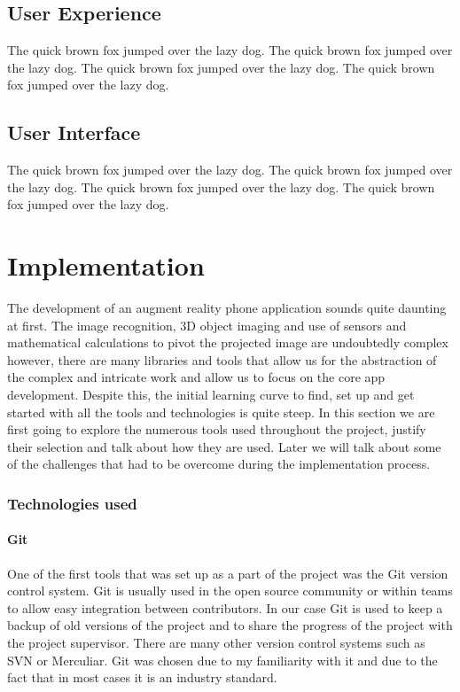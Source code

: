 \documentclass{l4proj}
\begin{document}
\section{User Experience}
The quick brown fox jumped over the lazy dog.
The quick brown fox jumped over the lazy dog.
The quick brown fox jumped over the lazy dog.
The quick brown fox jumped over the lazy dog.
\section{User Interface}
The quick brown fox jumped over the lazy dog.
The quick brown fox jumped over the lazy dog.
The quick brown fox jumped over the lazy dog.
The quick brown fox jumped over the lazy dog.

\chapter{Implementation}
The development of an augment reality phone application sounds quite daunting at first. The image recognition, 3D object imaging and use of sensors and mathematical calculations to pivot the projected image are undoubtedly complex however, there are many libraries and tools that allow us for the abstraction of the complex and intricate work and allow us to focus on the core app development. Despite this, the initial learning curve to find, set up and get started with all the tools and technologies is quite steep. In this section we are first going to explore the numerous tools used throughout the project, justify their selection and talk about how they are used. Later we will talk about some of the challenges that had to be overcome during the implementation process. 
\subsection{Technologies used}
\subsubsection{Git}
One of the first tools that was set up as a part of the project was the Git version control system. Git is usually used in the open source community or within teams to allow easy integration between contributors. In our case Git is used to keep a backup of old versions of the project and to share the progress of the project with the project supervisor. There are many other version control systems such as SVN or Merculiar. Git was chosen due to my familiarity with it and due to the fact that in most cases it is an industry standard.
	
\end{document}

